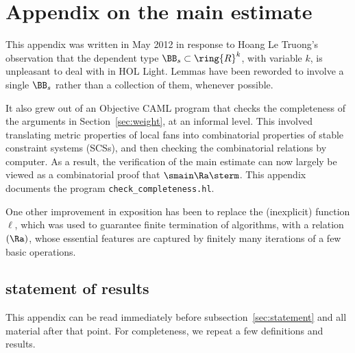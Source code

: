

\newpage
\section{Appendix on the main estimate}\label{sec:sup-local-fan}

This appendix was written in May 2012 in response to Hoang Le Truong's
observation that the dependent type $\BB_s\subset \ring{R}^k$, with
variable $k$, is unpleasant to deal with in HOL Light.  Lemmas have
been reworded to involve a single $\BB_s$ rather than a collection of
them, whenever possible.

It also grew out of an Objective CAML program that checks the
completeness of the arguments in Section~\ref{sec:weight}, at an
informal level.  This involved translating metric properties of local
fans into combinatorial properties of stable constraint systems (SCSs),
and then checking the combinatorial relations by computer.  As a
result, the verification of the main estimate can now largely be
viewed as a combinatorial proof that $\smain\Ra \sterm$.  This
appendix documents the program \verb!check_completeness.hl!.

One other improvement in exposition has been to replace the (inexplicit)
function $\ell$, which was used to guarantee finite termination of algorithms,
with a relation $(\Ra)$, whose essential features are captured by
finitely
many iterations of a few basic operations.

\subsection{statement of results}\label{sec:statement'}

This appendix can be read immediately before subsection~\ref{sec:statement}
and all material after that point.
For completeness, we repeat a few definitions and results.



